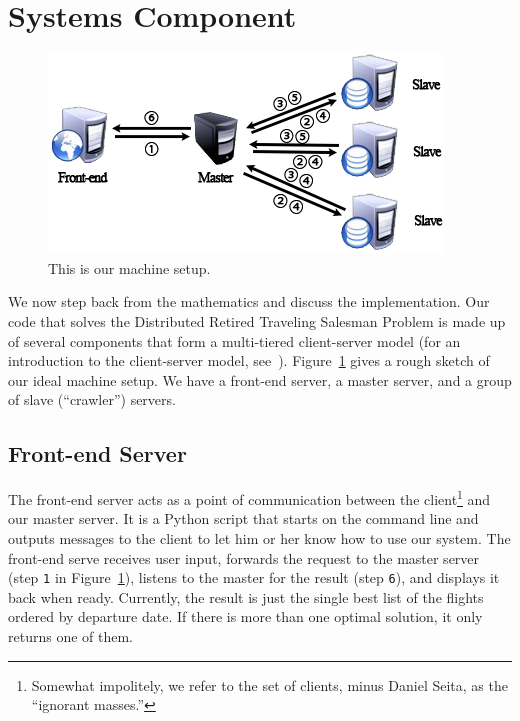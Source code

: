 \documentclass{article}
\begin{document}
\section{Systems Component}\label{sec:systems}

\begin{figure}[t]
\vskip 0.2in
\begin{center}
\centerline{\includegraphics[width=\columnwidth]{servers}}
\caption{This is our machine setup.}
\label{fig:machines}
\end{center}
\vskip -0.2in
\end{figure}

We now step back from the mathematics and discuss the implementation. Our code that solves the Distributed Retired Traveling Salesman Problem is
made up of several components that form a multi-tiered client-server model (for an introduction to the client-server model,
see~\cite{Tanenbaum:2006:DSP:1202502}). Figure~\ref{fig:machines} gives a rough sketch of our ideal machine setup. We have a front-end server, a
master server, and a group of slave (``crawler'') servers.  

\subsection{Front-end Server}\label{sec:front_end_server}

The front-end server acts as a point of communication between the client\footnote{Somewhat impolitely, we refer to the set of clients, minus Daniel
Seita, as the ``ignorant masses.''} and our master server. It is a Python script that starts on the command line and outputs messages to the client
to let him or her know how to use our system. The front-end serve receives user input, forwards the request to the master server (step \texttt{1} in
Figure~\ref{fig:machines}), listens to the master for the result (step \texttt{6}), and displays it back when ready. Currently, the result is just the
single best list of the flights ordered by departure date. If there is more than one optimal solution, it only returns one of them.
\end{document}

